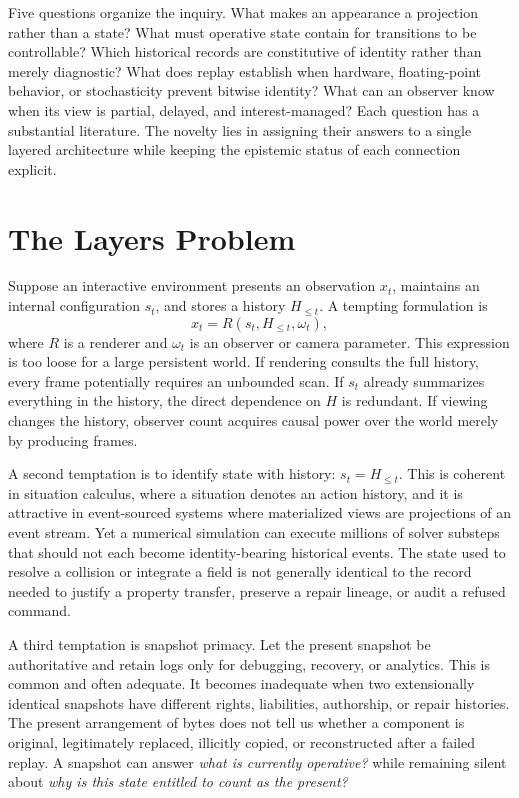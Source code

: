 \documentclass[11pt]{article}
\begin{document}
Five questions organize the inquiry. What makes an appearance a projection rather than a state? What must operative state contain for transitions to be controllable? Which historical records are constitutive of identity rather than merely diagnostic? What does replay establish when hardware, floating-point behavior, or stochasticity prevent bitwise identity? What can an observer know when its view is partial, delayed, and interest-managed? Each question has a substantial literature. The novelty lies in assigning their answers to a single layered architecture while keeping the epistemic status of each connection explicit.

\section{The Layers Problem}

Suppose an interactive environment presents an observation $x_t$, maintains an internal configuration $s_t$, and stores a history $H_{\leq t}$. A tempting formulation is
\[
x_t = R(s_t,H_{\leq t},\omega_t),
\]
where $R$ is a renderer and $\omega_t$ is an observer or camera parameter. This expression is too loose for a large persistent world. If rendering consults the full history, every frame potentially requires an unbounded scan. If $s_t$ already summarizes everything in the history, the direct dependence on $H$ is redundant. If viewing changes the history, observer count acquires causal power over the world merely by producing frames.

A second temptation is to identify state with history: $s_t=H_{\leq t}$. This is coherent in situation calculus, where a situation denotes an action history, and it is attractive in event-sourced systems where materialized views are projections of an event stream. Yet a numerical simulation can execute millions of solver substeps that should not each become identity-bearing historical events. The state used to resolve a collision or integrate a field is not generally identical to the record needed to justify a property transfer, preserve a repair lineage, or audit a refused command.

A third temptation is snapshot primacy. Let the present snapshot be authoritative and retain logs only for debugging, recovery, or analytics. This is common and often adequate. It becomes inadequate when two extensionally identical snapshots have different rights, liabilities, authorship, or repair histories. The present arrangement of bytes does not tell us whether a component is original, legitimately replaced, illicitly copied, or reconstructed after a failed replay. A snapshot can answer \emph{what is currently operative?} while remaining silent about \emph{why is this state entitled to count as the present?}
\end{document}
